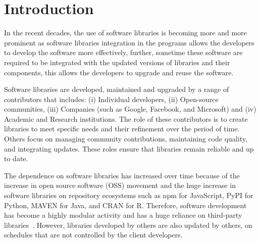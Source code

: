 \chapter{Introduction}
In the recent decades, the use of software libraries is becoming more and more prominent
as software libraries integration in the programs allows the developers to develop the
software more effectively, further, sometime these software are required to be integrated
with the updated versions of libraries and their components, this allows the developers to
upgrade and reuse the software.

Software libraries are developed, maintained and upgraded by a range of contributors
that includes: (i) Individual developers, (ii) Open-source communities, (iii) Companies
(such as Google, Facebook, and Microsoft) and (iv) Academic and Research institutions.
The role of these contributors is to create libraries to meet specific needs and their
refinement over the period of time. Others focus on managing community contributions,
maintaining code quality, and integrating updates. These roles ensure that libraries
remain reliable and up to date.

The dependence on software libraries has increased over time because of the increase in open source software (OSS) movement and the huge increase in software libraries on repository ecosystems such as npm for JavaScript, PyPI for Python, MAVEN for Java, and CRAN for R. Therefore, software development has become a highly modular activity and has a huge reliance on third-party libraries~\cite{decan2019empirical, kalliamvakou2014promises, zerouali2019formal, cox2019surviving}. However, libraries developed by others are
also updated by others, on schedules that are not controlled by the client developers.


